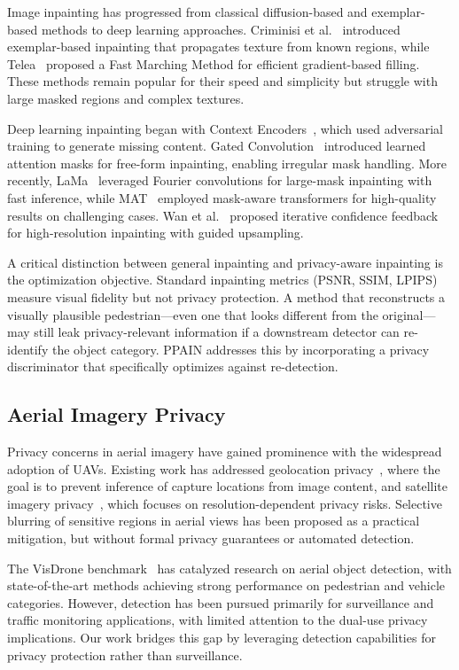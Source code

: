 \documentclass[preprint,12pt]{elsarticle}
\begin{document}
Image inpainting has progressed from classical diffusion-based and exemplar-based methods to deep learning approaches. Criminisi et al.~\cite{criminisi2004region} introduced exemplar-based inpainting that propagates texture from known regions, while Telea~\cite{telea2004imageinpainting} proposed a Fast Marching Method for efficient gradient-based filling. These methods remain popular for their speed and simplicity but struggle with large masked regions and complex textures.

Deep learning inpainting began with Context Encoders~\cite{pathak2016context}, which used adversarial training to generate missing content. Gated Convolution~\cite{yu2018free} introduced learned attention masks for free-form inpainting, enabling irregular mask handling. More recently, LaMa~\cite{suvorov2022lama} leveraged Fourier convolutions for large-mask inpainting with fast inference, while MAT~\cite{li2022mat} employed mask-aware transformers for high-quality results on challenging cases. Wan et al.~\cite{wan2021high} proposed iterative confidence feedback for high-resolution inpainting with guided upsampling.

A critical distinction between general inpainting and privacy-aware inpainting is the optimization objective. Standard inpainting metrics (PSNR, SSIM, LPIPS) measure visual fidelity but not privacy protection. A method that reconstructs a visually plausible pedestrian---even one that looks different from the original---may still leak privacy-relevant information if a downstream detector can re-identify the object category. PPAIN addresses this by incorporating a privacy discriminator that specifically optimizes against re-detection.

\subsection{Aerial Imagery Privacy}

Privacy concerns in aerial imagery have gained prominence with the widespread adoption of UAVs. Existing work has addressed geolocation privacy~\cite{varela2014geolocation}, where the goal is to prevent inference of capture locations from image content, and satellite imagery privacy~\cite{kpegas2021privacy}, which focuses on resolution-dependent privacy risks. Selective blurring of sensitive regions in aerial views has been proposed as a practical mitigation, but without formal privacy guarantees or automated detection.

The VisDrone benchmark~\cite{visdrone2019,du2020visdrone} has catalyzed research on aerial object detection, with state-of-the-art methods achieving strong performance on pedestrian and vehicle categories. However, detection has been pursued primarily for surveillance and traffic monitoring applications, with limited attention to the dual-use privacy implications. Our work bridges this gap by leveraging detection capabilities for privacy protection rather than surveillance.
\end{document}
